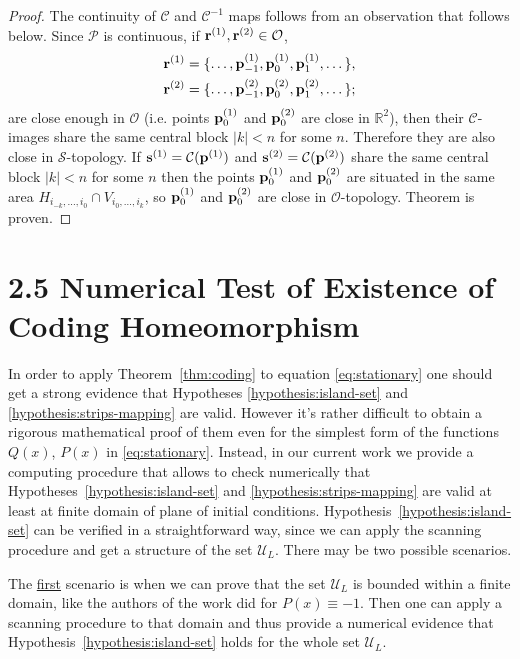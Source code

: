 \begin{proof}
	The continuity of $\mathcal{C}$ and $\mathcal{C}^{-1}$ maps follows from an observation that follows below.
	Since $\mathcal{P}$ is continuous, if $\vb{r}^{(1)}, \vb{r}^{(2)} \in \mathcal{O}$,
	\begin{eqnarray*}
		& \vb{r}^{(1)} = \{ \dots, \vb{p}_{-1}^{(1)}, \vb{p}_0^{(1)}, \vb{p}_1^{(1)}, \dots \}, \\
		& \vb{r}^{(2)} = \{ \dots, \vb{p}_{-1}^{(2)}, \vb{p}_0^{(2)}, \vb{p}_1^{(2)}, \dots \};
	\end{eqnarray*}
	are close enough in $\mathcal{O}$ (i.e. points $\vb{p}_0^{(1)}$ and $\vb{p}_0^{(2)}$ are close in $\mathbb{R}^2$), then their $\mathcal{C}$-images share the same central block $|k| < n$ for some $n$.
	Therefore they are also close in $\mathcal{S}$-topology.
	If $\vb{s}^{(1)} = \mathcal{C}(\vb{p}^{(1)})$ and $\vb{s}^{(2)} = \mathcal{C}(\vb{p}^{(2)})$ share the same central block $|k| < n$ for some $n$ then the points $\vb{p}_0^{(1)}$ and $\vb{p}_0^{(2)}$ are situated in the same area $H_{i_{-k}, \dots, i_0} \cap V_{i_0, \dots, i_k}$, so $\vb{p}_0^{(1)}$ and $\vb{p}_0^{(2)}$ are close in $\mathcal{O}$-topology.
	Theorem is proven.
\end{proof}

\section*{2.5 Numerical Test of Existence of Coding Homeomorphism}

In order to apply Theorem~\ref{thm:coding} to equation \eqref{eq:stationary} one should get a strong evidence that Hypotheses \ref{hypothesis:island-set} and \ref{hypothesis:strips-mapping} are valid.
However it's rather difficult to obtain a rigorous mathematical proof of them even for the simplest form of the functions $Q(x)$, $P(x)$ in \eqref{eq:stationary}.
Instead, in our current work we provide a computing procedure that allows to check numerically that Hypotheses~\ref{hypothesis:island-set} and \ref{hypothesis:strips-mapping} are valid at least at finite domain of plane of initial conditions.
Hypothesis~\ref{hypothesis:island-set} can be verified in a straightforward way, since we can apply the scanning procedure and get a structure of the set $\mathscr{U}_L$.
There may be two possible scenarios.

The \underline{first} scenario is when we can prove that the set $\mathscr{U}_L$ is bounded within a finite domain, like the authors of the work \cite{AlfimovAvramenko} did for $P(x) \equiv -1$.
Then one can apply a scanning procedure to that domain and thus provide a numerical evidence that Hypothesis~\ref{hypothesis:island-set} holds for the whole set $\mathscr{U}_L$.


